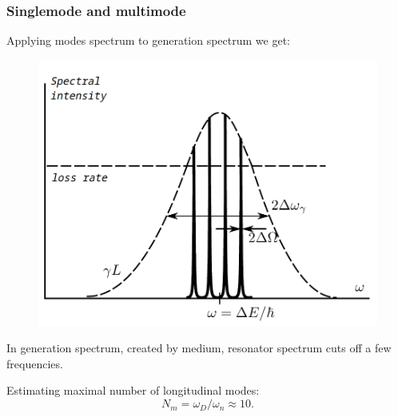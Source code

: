 \documentclass{beamer}
\begin{document}
	\begin{frame}
		\frametitle{Singlemode and multimode}
		
		Applying modes spectrum to generation spectrum we get:
		
		\begin{figure}
			\centering
			\includegraphics[width=0.6\linewidth]{res/overall_spectrum.png}
		\end{figure}
	
		In generation spectrum, created by medium, resonator spectrum cuts off a few frequencies.
		
		Estimating maximal number of longitudinal modes:
		$$ N_m = \omega_D / \omega_n \approx 10.$$
	\end{frame}
\end{document}
